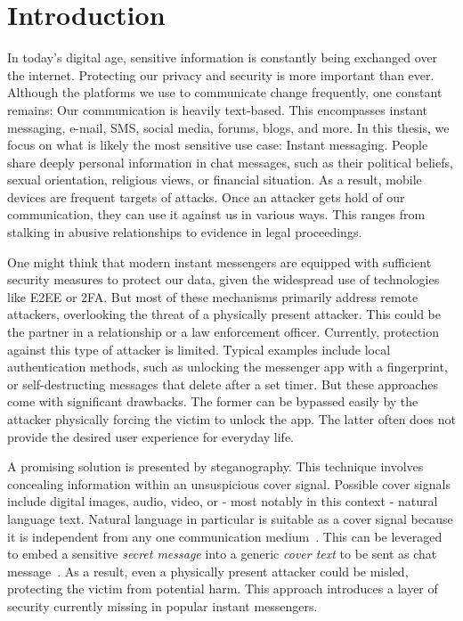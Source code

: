 
\chapter{Introduction}\label{ch:introduction}
\glsresetall %


In today's digital age, sensitive information is constantly being exchanged over the internet. Protecting our privacy and security is more important than ever. Although the platforms we use to communicate change frequently, one constant remains: Our communication is heavily text-based. This encompasses instant messaging, e-mail, \gls{SMS}, social media, forums, blogs, and more.
In this thesis, we focus on what is likely the most sensitive use case: Instant messaging. People share deeply personal information in chat messages, such as their political beliefs, sexual orientation, religious views, or financial situation. As a result, mobile devices are frequent targets of attacks. Once an attacker gets hold of our communication, they can use it against us in various ways. This ranges from stalking in abusive relationships to evidence in legal proceedings.

One might think that modern instant messengers are equipped with sufficient security measures to protect our data, given the widespread use of technologies like \gls{E2EE} or \gls{2FA}. But most of these mechanisms primarily address remote attackers, overlooking the threat of a physically present attacker. This could be the partner in a relationship or a law enforcement officer. Currently, protection against this type of attacker is limited. Typical examples include local authentication methods, such as unlocking the messenger app with a fingerprint, or self-destructing messages that delete after a set timer. But these approaches come with significant drawbacks. The former can be bypassed easily by the attacker physically forcing the victim to unlock the app. The latter often does not provide the desired user experience for everyday life.

A promising solution is presented by steganography. This technique involves concealing information within an unsuspicious cover signal. Possible cover signals include digital images, audio, video, or - most notably in this context - natural language text. Natural language in particular is suitable as a cover signal because it is independent from any one communication medium~\cite{zieglerNeuralLinguisticSteganography2019}. This can be leveraged to embed a sensitive \textit{secret message} into a generic \textit{cover text} to be sent as chat message~\cite{zieglerNeuralLinguisticSteganography2019}. As a result, even a physically present attacker could be misled, protecting the victim from potential harm. This approach introduces a layer of security currently missing in popular instant messengers.

